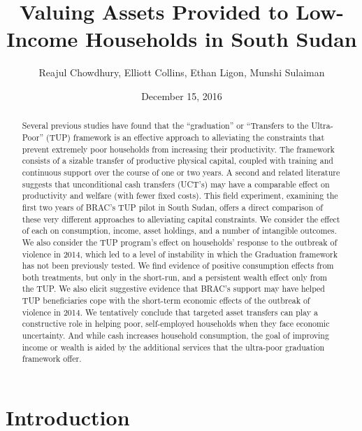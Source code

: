 \documentclass[12pt,article]{article}
\author{Reajul Chowdhury, Elliott Collins, Ethan Ligon, Munshi Sulaiman}
\date{December 15, 2016}
\title{Valuing Assets Provided to Low-Income Households in South Sudan}
\begin{document}
\maketitle
\begin{abstract}


Several previous studies have found that the ``graduation'' or ``Transfers to the
Ultra-Poor'' (TUP) framework is an effective approach to alleviating the constraints
that prevent extremely poor households from increasing their productivity. The
framework consists of a sizable transfer of productive physical capital, coupled with
training and continuous support over the course of one or two years. A second and
related literature suggests that unconditional cash transfers (UCT's) may have a
comparable effect on productivity and welfare (with fewer fixed costs). This field
experiment, examining the first two years of BRAC's TUP pilot in South Sudan, offers
a direct comparison of these very different approaches to alleviating capital
constraints. We consider the effect of each on consumption, income, asset holdings,
and a number of intangible outcomes. We also consider the TUP program's effect on
households' response to the outbreak of violence in 2014, which led to a level of
instability in which the Graduation framework has not been previously tested. We find
evidence of positive consumption effects from both treatments, but only in the
short-run, and a persistent wealth effect only from the TUP. We also elicit
suggestive evidence that BRAC's support may have helped TUP beneficiaries cope with
the short-term economic effects of the outbreak of violence in 2014. We tentatively
conclude that targeted asset transfers can play a constructive role in helping poor,
self-employed households when they face economic uncertainty. And while cash
increases household consumption, the goal of improving income or wealth is aided by
the additional services that the ultra-poor graduation framework offer.
\end{abstract}
\newpage

\section{Introduction}
\label{sec-1}
\end{document}

